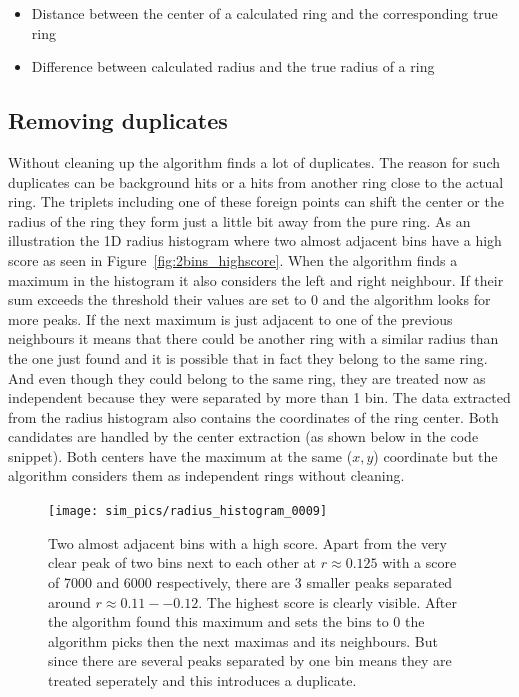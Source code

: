\documentclass[11pt]{scrreprt}
\begin{document}
\begin{itemize}
  \item Distance between the center of a calculated ring and the corresponding true ring
  \item Difference between calculated radius and the true radius of a ring
\end{itemize}

\subsection{Removing duplicates} %
\label{ssub:getting_rid_of_duplicates}


Without cleaning up the algorithm finds a lot of duplicates. The reason for such duplicates can be background hits or a hits from another 
ring close to the actual ring. The triplets including one of these foreign points can shift the center or the radius of the ring
they form just a little bit away from the pure ring. As an illustration the 1D radius histogram where two almost adjacent bins 
have a high score as seen in Figure~\ref{fig:2bins_highscore}. When the algorithm finds a maximum in the histogram it also considers the 
left and right neighbour. If their sum exceeds the threshold their values are set to 0 and the algorithm looks for more peaks. If the next
maximum is just adjacent to one of the previous neighbours it means that there could be another ring with a similar radius than the one
just found and it is possible that in fact they belong to the same ring.
And even though they could belong to the same ring, they are treated now as independent because they were separated by more than 1 bin.
The data extracted from the radius histogram also contains the coordinates of the ring center. Both candidates are handled by the center 
extraction (as shown below in the code snippet). Both centers have the maximum at the same ($x,y$) coordinate but the algorithm considers 
them as independent rings without cleaning.



\begin{figure}[htb]
  \centering
  \texttt{[image: sim\_pics/radius\_histogram\_0009]}
  \caption[Histogram of duplicates]{Two almost adjacent bins with a high score\label{fig:2bins_highscore}. Apart from the very clear peak of two bins next to each
  other at $r \approx 0.125$ with a score of 7000 and 6000 respectively, there are 3 smaller peaks separated around $r \approx 0.11--0.12$.
  The highest score is clearly visible. After the algorithm found this maximum and sets the bins to 0 the algorithm picks then the next
  maximas and its neighbours. But since there are several peaks separated by one bin means they are treated seperately and this introduces
  a duplicate.}
  \label{fig:bin_peak}
\end{figure}
\end{document}
